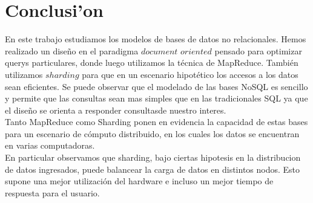 \section{Conclusi'on}

En este trabajo estudiamos los modelos de bases de datos no relacionales. Hemos realizado un diseño en el paradigma $document$ $oriented$ pensado para optimizar querys particulares,  donde luego utilizamos la técnica de MapReduce. También utilizamos $sharding$ para que en un escenario hipotético los accesos a los datos sean eficientes. Se puede observar que el modelado de las bases NoSQL es sencillo y permite que las consultas sean mas simples que en las tradicionales SQL ya que el diseño se orienta a responder consultasde nuestro interes.\\

Tanto MapReduce como Sharding ponen en evidencia la capacidad de estas bases para un escenario de cómputo distribuido, en los cuales los datos se encuentran en varias computadoras.\\

En particular observamos que sharding, bajo ciertas hipotesis en la distribucion de datos ingresados, puede balancear la carga de datos en distintos nodos. Esto supone una mejor utilización del hardware e incluso un mejor tiempo de respuesta para el usuario.
